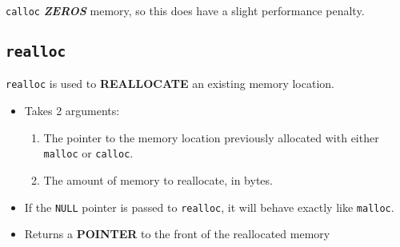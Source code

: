 \texttt{calloc} {\large{\textbf{\emph{ZEROS}}}} memory, so this does have a slight performance penalty.

\subsection{\texttt{realloc}}\label{subsec:realloc}
\texttt{realloc} is used to \textbf{REALLOCATE} an existing memory location.
\begin{itemize}
\item Takes 2 arguments:
  \begin{enumerate}
  \item The pointer to the memory location previously allocated with either \texttt{malloc} or \texttt{calloc}.
  \item The amount of memory to reallocate, in bytes.
  \end{enumerate}
\item If the \texttt{NULL} pointer is passed to \texttt{realloc}, it will behave exactly like \texttt{malloc}.
\item Returns a \textbf{POINTER} to the front of the reallocated memory
\end{itemize}


